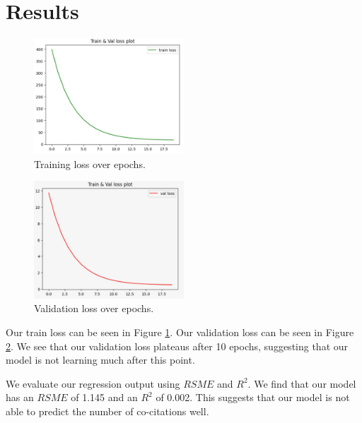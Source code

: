 \documentclass[10pt,twocolumn,letterpaper]{article}
\begin{document}
\section{Results}


\begin{figure}
      \centering
      \includegraphics[width=0.5\textwidth]{figures/train-loss.jpeg}
      \caption{Training loss over epochs.}
      \label{fig:train_loss}
\end{figure}

\begin{figure}
   \centering
   \includegraphics[width=0.5\textwidth]{figures/val-loss.jpeg}
   \caption{Validation loss over epochs.}
   \label{fig:val_loss}
\end{figure}

Our train loss can be seen in Figure \ref{fig:train_loss}. Our validation loss can be seen in Figure \ref{fig:val_loss}. We see that our validation loss plateaus after 10 epochs, suggesting that our model is not learning much after this point.

We evaluate our regression output using $RSME$ and $R^2$. We find that our model has an $RSME$ of 1.145 and an $R^2$ of 0.002. This suggests that our model is not able to predict the number of co-citations well. 
\end{document}
